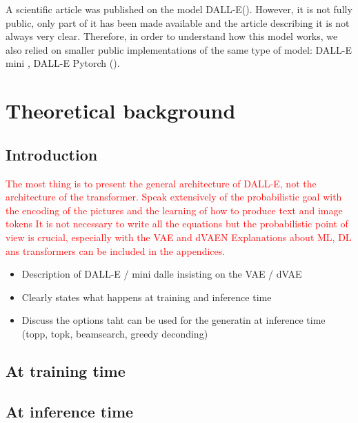 \documentclass{article}
\begin{document}
A scientific article was published on the model DALL-E(\cite{zeroshot}). However, it is not fully public, only part of it has been made available and the article describing it is not always very clear. Therefore, in order to understand how this model works, we also relied on smaller public implementations of the same type of model: DALL-E mini \cite{wandbdallemini}, DALL-E Pytorch (\cite{dallepytorch}).




\pagebreak
\section{Theoretical background}

\subsection{Introduction}
\textcolor{red}{
The most thing is to present the general architecture of DALL-E, not the architecture of the transformer. Speak extensively of the probabilistic goal with the encoding of the pictures and the learning of how to produce text and image tokens 
It is not necessary to write all the equations but the probabilistic point of view is crucial, especially with the VAE and dVAEN
Explanations about ML, DL ans transformers can be included in the appendices.
}


\begin{itemize}
    \item Description of DALL-E / mini dalle insisting on the VAE / dVAE 
    \item Clearly states what happens at training and inference time
    \item Discuss the options taht can be used for the generatin at inference time (topp, topk, beamsearch, greedy deconding)
\end{itemize}

\subsection{At training time}

\subsection{At inference time}
\end{document}
